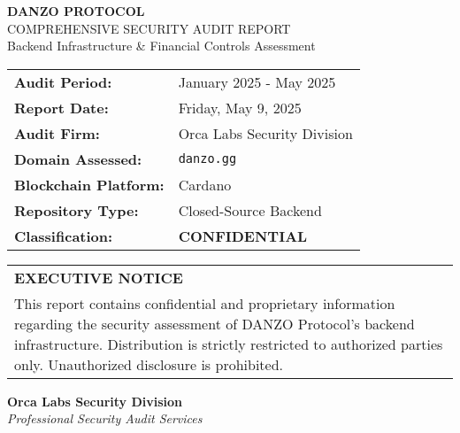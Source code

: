\documentclass[11pt,a4paper]{report}
\newenvironment{executivebox}
{\begin{center}\begin{tabular}{|p{0.9\textwidth}|}
\hline
\rowcolor{lightGray}
}
{\\\hline
\end{tabular}\end{center}}
\begin{document}
\begin{titlepage}
    \centering
    \vspace*{1cm}
    
    {\Huge\bfseries\color{danzoBlue} DANZO PROTOCOL}\\[0.5cm]
    {\LARGE\color{danzoGray} COMPREHENSIVE SECURITY AUDIT REPORT}\\[1.5cm]
    
    {\large Backend Infrastructure \& Financial Controls Assessment}\\[2cm]
    
    \begin{tabular}{p{4cm}p{6cm}}
        \textbf{Audit Period:} & January 2025 - May 2025 \\[0.3cm]
        \textbf{Report Date:} & Friday, May 9, 2025 \\[0.3cm]
        \textbf{Audit Firm:} & Orca Labs Security Division \\[0.3cm]
        \textbf{Domain Assessed:} & \texttt{danzo.gg} \\[0.3cm]
        \textbf{Blockchain Platform:} & Cardano \\[0.3cm]
        \textbf{Repository Type:} & Closed-Source Backend \\[0.3cm]
        \textbf{Classification:} & \textcolor{danzoRed}{\textbf{CONFIDENTIAL}} \\[0.3cm]
    \end{tabular}
    
    \vfill
    
    \begin{executivebox}
        \textbf{EXECUTIVE NOTICE}\\[0.2cm]
        This report contains confidential and proprietary information regarding the security assessment of DANZO Protocol's backend infrastructure. Distribution is strictly restricted to authorized parties only. Unauthorized disclosure is prohibited.
    \end{executivebox}
    
    \vspace{1cm}
    
    {\large\textbf{Orca Labs Security Division}}\\
    {\textit{Professional Security Audit Services}}
    
\end{titlepage}

\tableofcontents
\listoftables
\newpage

\end{document}
